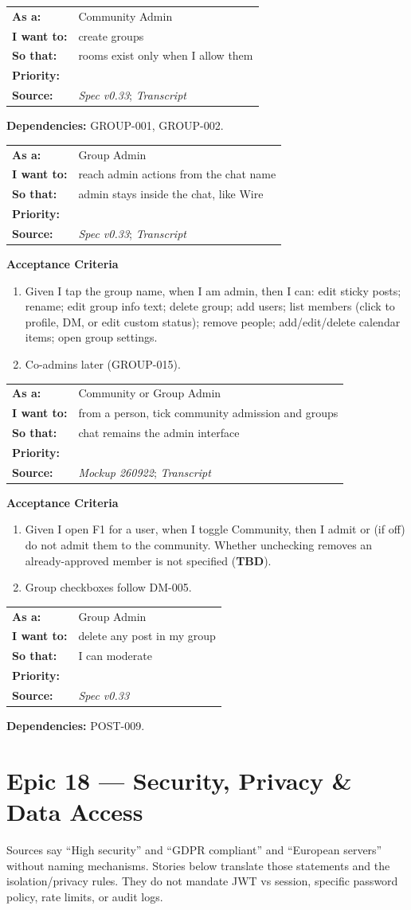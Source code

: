 \documentclass[11pt,a4paper]{article}
\makeatletter
\newcommand{\priPzero}{\colorbox{p0}{\makebox[4.6em]{\textcolor{white}{\scriptsize\bfseries P0 V1}}}}
\newcommand{\srcSpec}{\textit{Spec v0.33}}
\newcommand{\srcTx}{\textit{Transcript}}
\newcommand{\srcMock}{\textit{Mockup 260922}}
\newenvironment{story}[1]{%
  \Needspace{10\baselineskip}%
  \vspace{0.7em}%
  \noindent
  \colorbox{navy}{\makebox[\dimexpr\textwidth-2\fboxsep\relax][l]{\textcolor{white}{\bfseries\ #1}}}%
  \par\vspace{0.35em}%
}{\par\vspace{0.55em}}
\newcommand{\storymeta}[5]{%
  \noindent
  \begin{tabularx}{\textwidth}{@{}>{\bfseries}l X@{}}
    As a: & #1 \\
    I want to: & #2 \\
    So that: & #3 \\
    Priority: & #4 \\
    Source: & #5 \\
  \end{tabularx}
  \par\vspace{0.3em}
}
\newcommand{\achead}{\noindent\textbf{Acceptance Criteria}\par}
\newcommand{\deps}[1]{\noindent\textbf{Dependencies:} #1\par}
\makeatother
\begin{document}
\begin{story}{ADMIN-004 --- Community Admin creates groups in V1}
\storymeta{Community Admin}{create groups}{rooms exist only when I allow them}{\priPzero}{\srcSpec; \srcTx}
\deps{GROUP-001, GROUP-002.}
\end{story}

\begin{story}{ADMIN-005 --- Group Admin surface (chat-name menu)}
\storymeta{Group Admin}{reach admin actions from the chat name}{admin stays inside the chat, like Wire}{\priPzero}{\srcSpec; \srcTx}
\achead
\begin{enumerate}
  \item Given I tap the group name, when I am admin, then I can: edit sticky posts; rename; edit group info text; delete group; add users; list members (click to profile, DM, or edit custom status); remove people; add/edit/delete calendar items; open group settings.
  \item Co-admins later (GROUP-015).
\end{enumerate}
\end{story}

\begin{story}{ADMIN-006 --- Admit to community and assign groups (F1)}
\storymeta{Community or Group Admin}{from a person, tick community admission and groups}{chat remains the admin interface}{\priPzero}{\srcMock; \srcTx}
\achead
\begin{enumerate}
  \item Given I open F1 for a user, when I toggle Community, then I admit or (if off) do not admit them to the community. Whether unchecking removes an already-approved member is not specified (\textbf{TBD}).
  \item Group checkboxes follow DM-005.
\end{enumerate}
\end{story}

\begin{story}{ADMIN-007 --- Group Admin always deletes posts}
\storymeta{Group Admin}{delete any post in my group}{I can moderate}{\priPzero}{\srcSpec}
\deps{POST-009.}
\end{story}

\section{Epic 18 --- Security, Privacy \& Data Access}
Sources say ``High security'' and ``GDPR compliant'' and ``European servers'' without naming mechanisms. Stories below translate those statements and the isolation/privacy rules. They do not mandate JWT vs session, specific password policy, rate limits, or audit logs.
\end{document}
